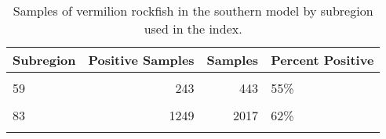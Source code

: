 \documentclass[
]{article}
\begin{document}
\begin{table}

\caption{\label{tab:tab-region-crfspr}Samples of vermilion rockfish in the southern model by subregion used in the index.}
\centering
\begin{tabular}[t]{lrrl}
\toprule
Subregion & Positive Samples & Samples & Percent Positive\\
\midrule
\cellcolor{gray!6}{37} & \cellcolor{gray!6}{1515} & \cellcolor{gray!6}{2617} & \cellcolor{gray!6}{58\%}\\
59 & 243 & 443 & 55\%\\
\cellcolor{gray!6}{73} & \cellcolor{gray!6}{1718} & \cellcolor{gray!6}{2904} & \cellcolor{gray!6}{59\%}\\
83 & 1249 & 2017 & 62\%\\
\cellcolor{gray!6}{111} & \cellcolor{gray!6}{2043} & \cellcolor{gray!6}{3972} & \cellcolor{gray!6}{51\%}\\
\bottomrule
\end{tabular}
\end{table}
\end{document}
